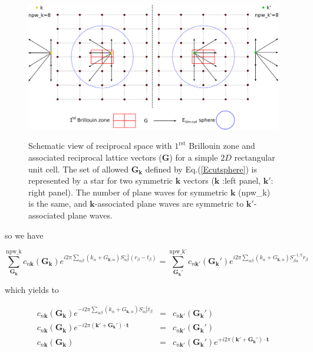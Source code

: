 \documentclass[a4paper,12pt]{report}
\begin{document}
\begin{figure}[!ht]
\centering
\begin{minipage}[c]{1.0\textwidth}
\includegraphics[width = \textwidth]{sym_Gk}
\end{minipage}
\vspace{0.27\textwidth}
\begin{minipage}[c]{0.8\textwidth}
\caption{\small Schematic view of reciprocal space with $1^{\text{rst}}$ Brillouin zone and associated reciprocal lattice vectors ($\mathbf{G}$) for a simple $2D$ rectangular unit cell. The set of allowed $\mathbf{G}_{\mathbf{k}}$ defined by Eq.(\ref{Ecutsphere}) is represented by a star for two symmetric $\mathbf{k}$ vectors ($\mathbf{k}$ :left panel, $\mathbf{k}'$: right panel). The number of plane waves for symmetric $\mathbf{k}$ (npw\_k) is the same, and $\mathbf{k}$-associated plane waves are symmetric to $\mathbf{k}'$-associated plane waves.}
\vspace*{1.0ex}
\label{sym_Gk}
\end{minipage}
\end{figure}

so we have

\begin{equation}
\sum_{\mathbf{G_{\mathbf{k}}}}^{\text{npw\_k}} c_{n\mathbf{k}}(\mathbf{G}_{\mathbf{k}}) e^{i2\pi \sum_{\alpha\beta} \left( k_{\alpha} + G_{\mathbf{k},\alpha}\right) S_{\alpha\beta}^{-1} \left(r_{\beta}-t_{\beta}\right)} = \sum_{\mathbf{G_{\mathbf{k}}'}}^{\text{npw\_k'}} c_{n\mathbf{k}'}(\mathbf{G}_{\mathbf{k}}') e^{i2\pi \sum_{\alpha\beta} \left(k_{\alpha} + G_{\mathbf{k},\alpha}\right)S_{\beta\alpha}^{-1,\mathtt{t}} r_{\beta}} \nonumber
\end{equation}

which yields to

\begin{eqnarray}
c_{n\mathbf{k}}(\mathbf{G}_{\mathbf{k}}) e^{-i2\pi \sum_{\alpha\beta} \left( k_{\alpha} + G_{\mathbf{k},\alpha}\right) S_{\alpha\beta}^{-1} t_{\beta}} &=& c_{n\mathbf{k}'}(\mathbf{G}_{\mathbf{k}}') \nonumber \\
c_{n\mathbf{k}}(\mathbf{G}_{\mathbf{k}}) e^{-i2\pi \left( \mathbf{k}' + \mathbf{G}_{\mathbf{k}}'\right)\cdotp \mathbf{t}} &=& c_{n\mathbf{k}'}(\mathbf{G}_{\mathbf{k}}') \nonumber \\
c_{n\mathbf{k}}(\mathbf{G}_{\mathbf{k}}) &=& c_{n\mathbf{k}'}(\mathbf{G}_{\mathbf{k}}') e^{+i2\pi \left( \mathbf{k}' + \mathbf{G}_{\mathbf{k}}'\right)\cdotp \mathbf{t}}
\end{eqnarray}
\end{document}
